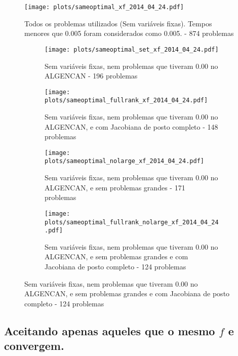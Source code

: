 \documentclass{article}
\begin{document}
\begin{figure}[H]
  \centering
  \texttt{[image: plots/sameoptimal\_xf\_2014\_04\_24.pdf]}
  \caption{Todos os problemas utilizados (Sem variáveis fixas). Tempos menores
    que 0.005 foram considerados como 0.005. - 874 problemas}
\end{figure}
\begin{figure}[H]
  \centering
  \begin{subfigure}{0.48\textwidth}
    \texttt{[image: plots/sameoptimal\_set\_xf\_2014\_04\_24.pdf]}
    \caption{Sem variáveis fixas, nem problemas
      que tiveram 0.00 no ALGENCAN - 196 problemas}
  \end{subfigure}
  \begin{subfigure}{0.48\textwidth}
    \texttt{[image: plots/sameoptimal\_fullrank\_xf\_2014\_04\_24.pdf]}
    \caption{Sem variáveis fixas, nem problemas
      que tiveram 0.00 no ALGENCAN, e com Jacobiana de posto completo - 148
      problemas}
  \end{subfigure}
  \begin{subfigure}{0.48\textwidth}
    \texttt{[image: plots/sameoptimal\_nolarge\_xf\_2014\_04\_24.pdf]}
    \caption{Sem variáveis fixas, nem problemas
      que tiveram 0.00 no ALGENCAN, e sem problemas grandes - 171 problemas}
  \end{subfigure}
  \begin{subfigure}{0.48\textwidth}
    \texttt{[image: plots/sameoptimal\_fullrank\_nolarge\_xf\_2014\_04\_24.pdf]}
    \caption{Sem variáveis fixas, nem problemas
      que tiveram 0.00 no ALGENCAN, e sem problemas grandes e com Jacobiana de
      posto completo - 124 problemas}
  \end{subfigure}
\end{figure}

\subsection{Aceitando apenas aqueles que o mesmo $f$ e convergem. }
\end{document}
